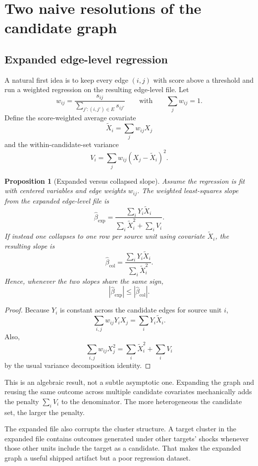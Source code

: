 \documentclass[12pt]{article}
\newtheorem{proposition}{Proposition}
\theoremstyle{remark}
\begin{document}
\section{Two naive resolutions of the candidate graph}

\subsection{Expanded edge-level regression}

A natural first idea is to keep every edge $(i,j)$ with score above a threshold and run a weighted regression on the resulting edge-level file. Let
\[
w_{ij}=\frac{s_{ij}}{\sum_{j':(i,j')\in E}s_{ij'}}
\qquad\text{with}\qquad \sum_j w_{ij}=1.
\]
Define the score-weighted average covariate
\[
\tilde X_i=\sum_j w_{ij}X_j
\]
and the within-candidate-set variance
\[
V_i=\sum_j w_{ij}(X_j-\tilde X_i)^2.
\]

\begin{proposition}[Expanded versus collapsed slope]
Assume the regression is fit with centered variables and edge weights $w_{ij}$. The weighted least-squares slope from the expanded edge-level file is
\[
\hat\beta_{\mathrm{exp}}
=
\frac{\sum_i Y_i\tilde X_i}{\sum_i \tilde X_i^2+\sum_i V_i}.
\]
If instead one collapses to one row per source unit using covariate $\tilde X_i$, the resulting slope is
\[
\hat\beta_{\mathrm{col}}
=
\frac{\sum_i Y_i\tilde X_i}{\sum_i \tilde X_i^2}.
\]
Hence, whenever the two slopes share the same sign,
\[
|\hat\beta_{\mathrm{exp}}|\le |\hat\beta_{\mathrm{col}}|.
\]
\end{proposition}

\begin{proof}
Because $Y_i$ is constant across the candidate edges for source unit $i$,
\[
\sum_{i,j} w_{ij}Y_iX_j=\sum_i Y_i\tilde X_i.
\]
Also,
\[
\sum_{i,j} w_{ij}X_j^2=\sum_i \tilde X_i^2+\sum_i V_i
\]
by the usual variance decomposition identity.
\end{proof}

This is an algebraic result, not a subtle asymptotic one. Expanding the graph and reusing the same outcome across multiple candidate covariates mechanically adds the penalty $\sum_i V_i$ to the denominator. The more heterogeneous the candidate set, the larger the penalty.

The expanded file also corrupts the cluster structure. A target cluster in the expanded file contains outcomes generated under other targets' shocks whenever those other units include the target as a candidate. That makes the expanded graph a useful shipped artifact but a poor regression dataset.
\end{document}
